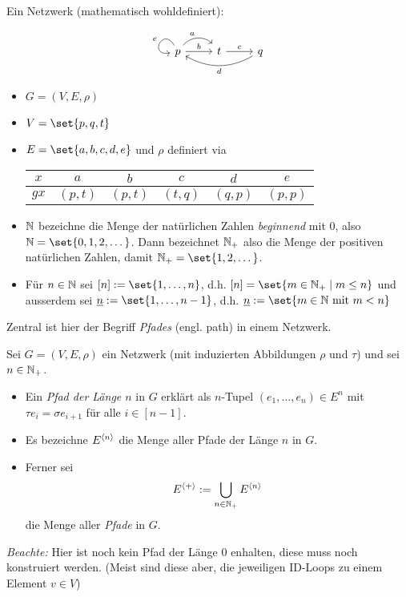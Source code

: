 \begin{example}
    Ein Netzwerk (mathematisch wohldefiniert):
    $$
    \begin{tikzcd}
        p \arrow[r, "a", bend left=49] \arrow[r, "b"] \arrow["e"', loop, distance=2em, in=190, out=120] & t \arrow[r, "c"] & q \arrow[ll, "d", bend left]
    \end{tikzcd}
    $$
    \begin{itemize}
        \item $G = (V,E,\rho)$
        \item $V= \set{p,q,t}$
        \item $E = \set{a,b,c,d,e}$ und $\rho$ definiert via
        \begin{center}
            \begin{tabular}{c||c|c|c|c|c}
                $x$ & $a$ & $b$ & $c$ & $d$ & $e$ \\ \hline 
                $gx$ & $(p,t)$ & $(p,t)$ & $(t,q)$ & $(q,p)$ & $(p,p)$\\ %
            \end{tabular}
        \end{center}
    \end{itemize}
\end{example}
\begin{notation}
    \begin{itemize}
        \item $\mathbb{N}$ bezeichne die Menge der natürlichen Zahlen \emph{beginnend} mit 0, also $\N = \set{0,1,2,\dots}$. Dann bezeichnet $\mathbb{N}_+$  also die Menge der positiven natürlichen Zahlen, damit $\N_+ = \set{1,2,\dots}$.
        \item Für $n \in \mathbb{N}$ sei $[n] := \set{1,\dots,n}$, d.h. $[n] = \set{m \in \N_+ \mid m \le n}$ und ausserdem sei $\emph{n}:= \set{1, \dots, n-1}$, d.h. $\emph{n} := \set{m \in \N \mit m < n}$
    \end{itemize}
\end{notation}
Zentral ist hier der Begriff \emph{Pfades} (engl. path) in einem Netzwerk.
\begin{definition}
    Sei $G = (V,E,\rho)$ ein Netzwerk (mit induzierten Abbildungen $\rho$ und $\tau$) und sei $n \in \mathbb{N}_+$. 
    \begin{itemize}
        \item Ein \emph{Pfad der Länge $n$} in $G$ erklärt als $n$-Tupel $(e_1, \dots, e_n) \in E^n$ mit $\tau e_i = \sigma e_{i+1}$ für alle $i \in [n-1]$.
        \item Es bezeichne $E^{\langle n\rangle}$ die Menge aller Pfade der Länge $n$ in $G$.
        \item Ferner sei 
        \begin{align*}
            E^{\langle +\rangle} := \bigcup_{n \in \mathbb{N}_+} E^{\langle n\rangle}
        \end{align*}
        die Menge aller \emph{Pfade} in $G$.
    \end{itemize}
    \emph{Beachte:} Hier ist noch kein Pfad der Länge 0 enhalten, diese muss noch konstruiert werden. (Meist sind diese aber, die jeweiligen ID-Loops zu einem Element $v \in V$)
\end{definition}
